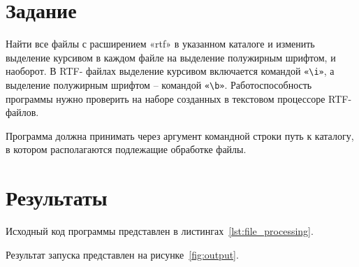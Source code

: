 \documentclass[a4paper, 14pt]{extarticle}
\begin{document}
\renewcommand{\ttdefault}{pcr}

\setlength{\tabcolsep}{3pt}
\newpage
\setcounter{page}{2}

\section{Задание}\label{Sect::task}

Найти все файлы с расширением «rtf» в указанном
каталоге и изменить выделение курсивом в каждом файле
на выделение полужирным шрифтом, и наоборот. В RTF-
файлах выделение курсивом включается командой \verb|«\i»|, а
выделение полужирным шрифтом – командой \verb|«\b»|.
Работоспособность программы нужно проверить на
наборе созданных в текстовом процессоре RTF-файлов.

Программа должна принимать через аргумент командной строки путь к
каталогу, в котором располагаются подлежащие обработке файлы.

\section{Результаты}\label{Sect::res}

Исходный код программы представлен в листингах~\ref{lst:file_processing}.

Результат запуска представлен на рисунке~\ref{fig:output}.
\end{document}
